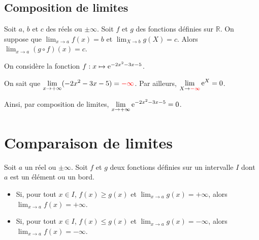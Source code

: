 \documentclass[11pt,fleqn, openany]{book} %
\begin{document}
\begin{example}
\begin{center}
\end{center}
\vspace{-1cm}
\end{example}

\subsection{Composition de limites}

\begin{proposition}Soit $a$, $b$ et $c$ des réels ou $\pm \infty$. Soit $f$ et $g$ des fonctions définies sur $\mathbb{R}$.
On suppose que $\displaystyle\lim_{x \to a}f(x)=b$ et $\displaystyle\lim_{X \to b}g(X)=c$. Alors $\displaystyle\lim_{x \to a}(g \circ f)(x)=c$.
\end{proposition}


\begin{example} On considère la fonction $f:x\mapsto \mathrm{e}^{-2x^2-3x-5}$. 

On sait que $\displaystyle \lim_{x \to +\infty} (-2x^2-3x-5) = \color{red}{-\infty}$. Par ailleurs, $\displaystyle\lim_{X \to \color{red}{-\infty}}\color{black}\mathrm{e}^X=0$. 

Ainsi, par composition de limites, $\displaystyle \lim_{x \to +\infty} \mathrm{e}^{-2x^2-3x-5}=0$.\end{example}



\section{Comparaison de limites}

\begin{theorem}Soit $a$ un réel ou $\pm \infty$. Soit $f$ et $g$ deux fonctions définies sur un intervalle $I$ dont $a$ est un élément ou un bord.
\begin{itemize}
\item Si, pour tout $x\in I$, $f(x)\geqslant g(x)$ et $\displaystyle \lim_{x \to a} g(x)=+\infty$, alors $\displaystyle \lim_{x \to a} f(x)=+\infty$.
\item Si, pour tout $x\in I$, $f(x)\leqslant g(x)$ et $\displaystyle \lim_{x \to a} g(x)=-\infty$, alors $\displaystyle \lim_{x \to a} f(x)=-\infty$.
\end{itemize}\end{theorem}
\end{document}
